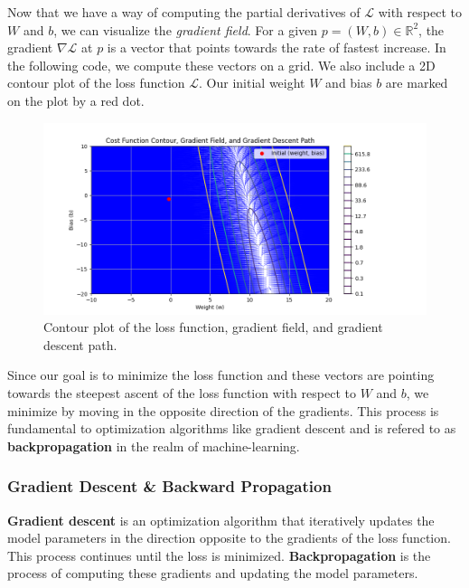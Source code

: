 

Now that we have a way of computing the partial derivatives of $\mathcal{L}$ with respect to $W$ and $b$, we can visualize the \textit{gradient field}. For a given $p=(W, b) \in \mathbb{R}^2$, the gradient $\nabla \mathcal{L}$ at $p$ is a vector that points towards the rate of fastest increase. In the following code, we compute these vectors on a grid. We also include a 2D contour plot of the loss function $\mathcal{L}$. Our initial weight $W$ and bias $b$ are marked on the plot by a red dot.



\begin{figure}
\centering
\includegraphics[width=330pt]{Regression/code/gradient-field-1.png}
\caption{Contour plot of the loss function, gradient field, and gradient descent path.}
\label{fig:linear3}
\end{figure}

Since our goal is to minimize the loss function and these vectors are pointing towards the steepest ascent of the loss function with respect to $W$ and $b$, we minimize by moving in the opposite direction of the gradients. This process is fundamental to optimization algorithms like gradient descent and is refered to as \textbf{backpropagation} in the realm of machine-learning.

\subsubsection{Gradient Descent \& Backward Propagation}
\label{subsubsec:2}
\textbf{Gradient descent} is an optimization algorithm that iteratively updates the model parameters in the direction opposite to the gradients of the loss function. This process continues until the loss is minimized. \textbf{Backpropagation} is the process of computing these gradients and updating the model parameters.

